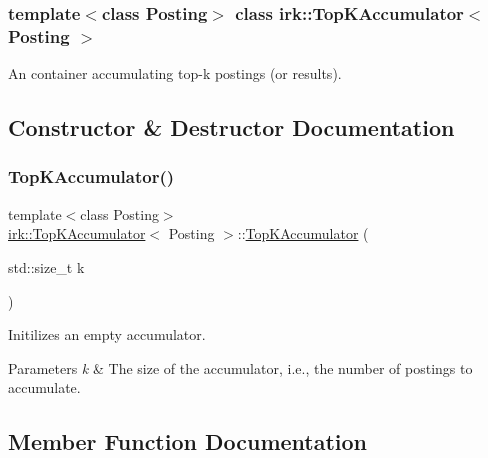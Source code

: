 \subsubsection*{template$<$class Posting$>$\newline
class irk\+::\+Top\+K\+Accumulator$<$ Posting $>$}

An container accumulating top-\/k postings (or results). 

\subsection{Constructor \& Destructor Documentation}
\mbox{\label{classirk_1_1TopKAccumulator_a4f610f220ca415333709456f1acf65e2}} 
\subsubsection{\texorpdfstring{Top\+K\+Accumulator()}{TopKAccumulator()}}
{\footnotesize\ttfamily template$<$class Posting$>$ \\
\mbox{\hyperlink{classirk_1_1TopKAccumulator}{irk\+::\+Top\+K\+Accumulator}}$<$ Posting $>$\+::\mbox{\hyperlink{classirk_1_1TopKAccumulator}{Top\+K\+Accumulator}} (\begin{DoxyParamCaption}\item[{std\+::size\+\_\+t}]{k }\end{DoxyParamCaption})\hspace{0.3cm}{\ttfamily [inline]}}



Initilizes an empty accumulator. 


\begin{DoxyParams}{Parameters}
{\em k} & The size of the accumulator, i.\+e., the number of postings to accumulate. \\
\hline
\end{DoxyParams}


\subsection{Member Function Documentation}
\mbox{\label{classirk_1_1TopKAccumulator_a2292c74efb19b719f65287cf4d0e1dec}} 
